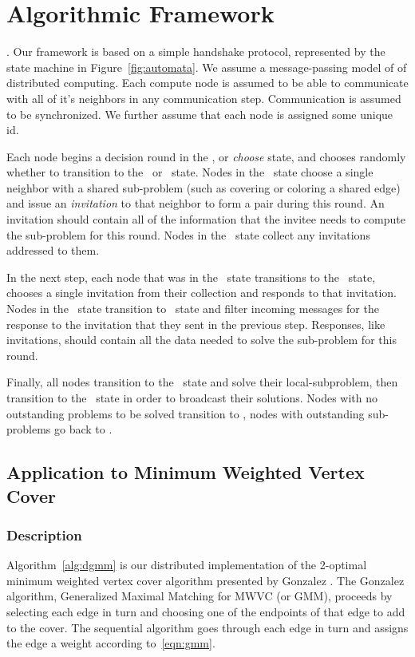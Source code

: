 \documentclass[conference, 10pt, letter]{IEEEtran}
\begin{document}
\section{Algorithmic Framework}
\label{sec:framework}.
Our framework is based on a simple handshake protocol, represented by the state machine in Figure~\ref{fig:automata}. We assume a message-passing model of of distributed computing. Each compute node is assumed to be able to communicate with all of it's neighbors in any communication step. Communication is assumed to be synchronized. We further assume that each node is assigned some unique id.



Each node begins a decision round in the \cCd, or {\em choose} state, and chooses randomly whether to transition to the \cId\ or \cLd\ state. Nodes in the \cId\ state choose a single neighbor with a shared sub-problem (such as covering or coloring a shared edge) and issue an {\em invitation} to that neighbor to form a pair during this round. An invitation should contain all of the information that the invitee needs to compute the sub-problem for this round. Nodes in the \cLd\ state collect any invitations addressed to them. 

In the next step, each node that was in the \cLd\ state transitions to the \cRd\ state, chooses a single invitation from their collection and responds to that invitation. Nodes in the \cId\ state transition to \cWd\ state and filter incoming messages for the response to the invitation that they sent in the previous step. Responses, like invitations, should contain all the data needed to solve the sub-problem for this round. 

Finally, all nodes transition to the \cUd\ state and solve their local-subproblem, then transition to the \cEd\ state in order to broadcast their solutions. Nodes with no outstanding problems to be solved transition to \cDd, nodes with outstanding sub-problems go back to \cCd.

\subsection{Application to Minimum Weighted Vertex Cover}
\label{sub:algorithms-dgmm}
\subsubsection{Description}
\label{ssb:algorithms-dgmm-description}

Algorithm~\ref{alg:dgmm} is our distributed implementation of the 2-optimal minimum weighted vertex cover algorithm presented by Gonzalez \cite{Gonzalez1995129}. The Gonzalez algorithm, Generalized Maximal Matching for MWVC (or GMM), proceeds by selecting each edge in turn and choosing one of the endpoints of that edge to add to the cover. The sequential algorithm goes through each edge in turn and assigns the edge a weight according to~\eqref{eqn:gmm}.
\end{document}
